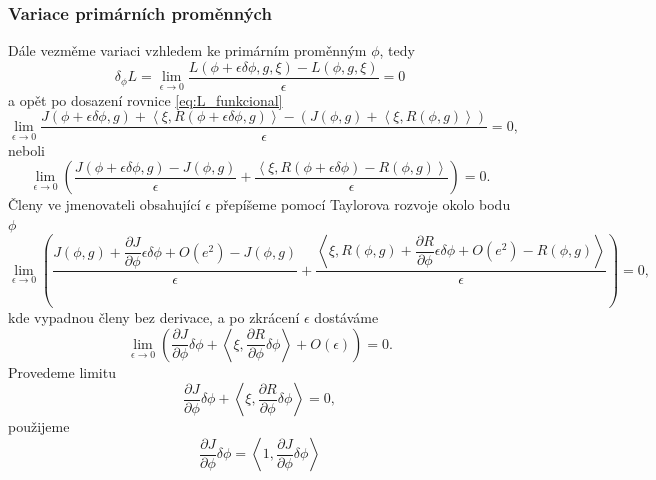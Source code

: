 \subsubsection{Variace primárních proměnných}
Dále vezměme variaci vzhledem ke primárním proměnným $ \phi $, tedy
\begin{equation*}
\delta_\phi L =
\lim\limits_{\epsilon\rightarrow0}
\dfrac{L(\phi+\epsilon\delta\phi,g,\xi)-L(\phi,g,\xi)}
{\epsilon}
=0
\end{equation*}
a opět po dosazení rovnice \ref{eq:L_funkcional}
\begin{equation*}
\lim\limits_{\epsilon\rightarrow0} \dfrac
{J(\phi+\epsilon\delta\phi, g) + 
 \left\langle\xi , R(\phi+\epsilon\delta\phi, g) \right\rangle -  (J(\phi, g) +  \left\langle\xi , R(\phi, g)\right\rangle)}
{\epsilon}
=0,
\end{equation*}
neboli
\begin{equation*}
\lim\limits_{\epsilon\rightarrow 0} 
\left(
\dfrac
{J(\phi+\epsilon\delta\phi, g) - J(\phi, g)}
{\epsilon}
+
\dfrac
{  \left\langle\xi , R(\phi+\epsilon\delta\phi) - R(\phi, g)\right\rangle }
{\epsilon}
\right)
=0.
\end{equation*}
Členy ve jmenovateli obsahující $ \epsilon $ přepíšeme pomocí Taylorova rozvoje okolo bodu $ \phi $
\begin{equation*}
\lim\limits_{\epsilon\rightarrow 0} 
\left(
\dfrac
{J(\phi, g) + \dfrac{\partial J}{\partial \phi}\epsilon\delta\phi + O(e^2) - J(\phi, g)}
{\epsilon}
+
\dfrac
{  \left\langle\xi , R(\phi,g) + \dfrac{\partial R}{\partial \phi} \epsilon \delta\phi + O(e^2) - R(\phi,g)\right\rangle }
{\epsilon}
\right)
=0,
\end{equation*}
kde vypadnou členy bez derivace, a po zkrácení $ \epsilon $ dostáváme
\begin{equation*}
\lim\limits_{\epsilon\rightarrow 0} 
\left(
\dfrac{\partial J}{\partial \phi}\delta\phi
+  \left\langle\xi , \dfrac{\partial R}{\partial \phi} \delta\phi \right\rangle
+O(\epsilon)
\right)
=0.
\end{equation*}
Provedeme limitu 
\begin{equation}\label{eq:sdruzene_rce_variace}
\frac{\partial J}{\partial \phi}\delta\phi
+  \left\langle\xi , \dfrac{\partial R}{\partial \phi} \delta\phi\right\rangle
=0,
\end{equation}
použijeme 
\begin{equation*}
\frac{\partial J}{\partial \phi}\delta\phi = \left\langle 1, \frac{\partial J}{\partial \phi}\delta\phi \right\rangle
\end{equation*}
